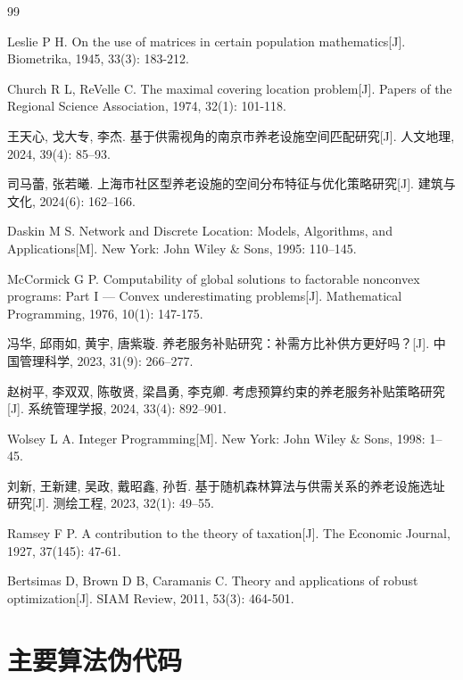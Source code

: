 \documentclass[12pt,a4paper]{ctexart}
\begin{document}
\begin{thebibliography}{99}

 Leslie P H. On the use of matrices in certain population mathematics[J]. Biometrika, 1945, 33(3): 183-212.

 Church R L, ReVelle C. The maximal covering location problem[J]. Papers of the Regional Science Association, 1974, 32(1): 101-118.

 王天心, 戈大专, 李杰. 基于供需视角的南京市养老设施空间匹配研究[J]. 人文地理, 2024, 39(4): 85--93.

 司马蕾, 张若曦. 上海市社区型养老设施的空间分布特征与优化策略研究[J]. 建筑与文化, 2024(6): 162--166.

 Daskin M S. Network and Discrete Location: Models, Algorithms, and Applications[M]. New York: John Wiley \& Sons, 1995: 110--145.

 McCormick G P. Computability of global solutions to factorable nonconvex programs: Part I — Convex underestimating problems[J]. Mathematical Programming, 1976, 10(1): 147-175.

 冯华, 邱雨如, 黄宇, 唐紫璇. 养老服务补贴研究：补需方比补供方更好吗？[J]. 中国管理科学, 2023, 31(9): 266--277.

 赵树平, 李双双, 陈敬贤, 梁昌勇, 李克卿. 考虑预算约束的养老服务补贴策略研究[J]. 系统管理学报, 2024, 33(4): 892--901.

 Wolsey L A. Integer Programming[M]. New York: John Wiley \& Sons, 1998: 1--45.

 刘新, 王新建, 吴政, 戴昭鑫, 孙哲. 基于随机森林算法与供需关系的养老设施选址研究[J]. 测绘工程, 2023, 32(1): 49--55.

 Ramsey F P. A contribution to the theory of taxation[J]. The Economic Journal, 1927, 37(145): 47-61.

 Bertsimas D, Brown D B, Caramanis C. Theory and applications of robust optimization[J]. SIAM Review, 2011, 53(3): 464-501.

\end{thebibliography}

\newpage

\appendix

\section{主要算法伪代码}
\end{document}

